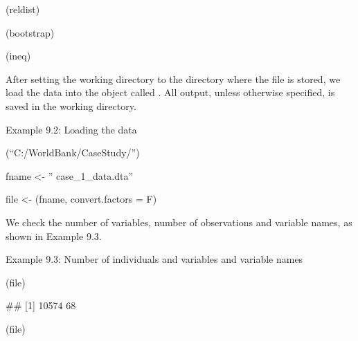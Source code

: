 \documentclass[letterpaper,10pt,english]{sphinxmanual}
\begin{document}
(reldist) 

\begin{DUlineblock}{0em}
\item[] (bootstrap) 
\item[] (ineq) 
\end{DUlineblock}

After setting the working directory to the directory where the 
file is stored, we load the data into the object called . All
output, unless otherwise specified, is saved in the working directory.

Example 9.2: Loading the data

(“C:/WorldBank/CaseStudy/”) 

\begin{DUlineblock}{0em}
\item[] 
\item[] fname \textless{}- ” case\_1\_data.dta”
\item[] 
\item[] file \textless{}- (fname, convert.factors = F) 
\end{DUlineblock}

We check the number of variables, number of observations and variable
names, as shown in Example 9.3.

Example 9.3: Number of individuals and variables and variable names

(file) 

\#\# {[}1{]} 10574 68

(file) 
\end{document}
